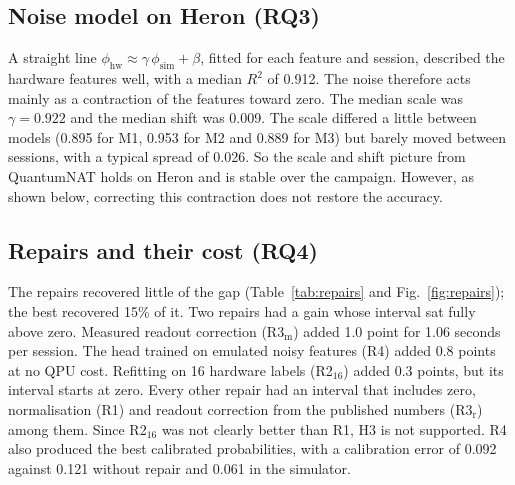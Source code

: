 \documentclass[10pt,conference]{IEEEtran}
\begin{document}
\subsection{Noise model on Heron (RQ3)}
A straight line $\phi_{\mathrm{hw}}\approx\gamma\,\phi_{\mathrm{sim}}+\beta$, fitted for each
feature and session, described the hardware features well, with a median $R^2$ of 0.912. The noise therefore acts mainly as a contraction of the features toward zero. The median scale was $\gamma=0.922$ and
the median shift was 0.009. The scale differed a little between models (0.895 for M1, 0.953
for M2 and 0.889 for M3) but barely moved between sessions, with a typical spread of 0.026. So the
scale and shift picture from QuantumNAT \cite{wang2022quantumnat} holds on Heron and is stable over the campaign. However, as shown below, correcting this
contraction does not restore the accuracy.

\subsection{Repairs and their cost (RQ4)}
The repairs recovered little of the gap (Table~\ref{tab:repairs} and Fig.~\ref{fig:repairs}); the
best recovered 15\% of it. Two repairs had a gain whose
interval sat fully above zero. Measured readout correction (R3$_\mathrm{m}$) added 1.0 point for
1.06 seconds per session. The head trained on emulated noisy features (R4) added 0.8 points at no QPU cost. Refitting on 16 hardware labels (R2$_{16}$) added 0.3 points, but its interval starts at zero. Every other repair had an interval that includes zero, normalisation (R1) and
readout correction from the published numbers (R3$_\mathrm{r}$) among them. Since R2$_{16}$ was not
clearly better than R1, H3 is not supported. R4 also produced the best calibrated probabilities, with
a calibration error of 0.092 against 0.121 without repair and 0.061 in the simulator.
\end{document}
